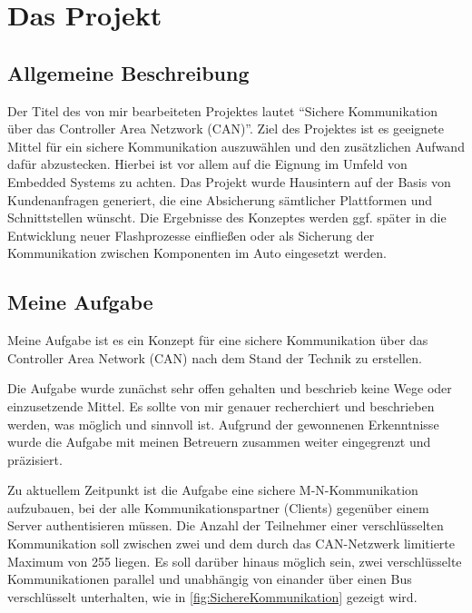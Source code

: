 \section{Das Projekt}
\subsection{Allgemeine Beschreibung}

Der Titel des von mir bearbeiteten Projektes lautet "`Sichere Kommunikation über das Controller Area Netzwork (CAN)"'. 
Ziel des Projektes ist es geeignete Mittel für ein sichere Kommunikation auszuwählen und den zusätzlichen Aufwand dafür abzustecken. Hierbei ist vor allem auf die Eignung im Umfeld von Embedded Systems zu achten. 
Das Projekt wurde Hausintern auf der Basis von Kundenanfragen generiert, die eine Absicherung sämtlicher Plattformen und Schnittstellen wünscht.
Die Ergebnisse des Konzeptes werden ggf. später in die Entwicklung neuer Flashprozesse einfließen oder als Sicherung der Kommunikation zwischen Komponenten im Auto eingesetzt werden.


\subsection{Meine Aufgabe} %

Meine Aufgabe ist es ein Konzept für eine sichere Kommunikation über das Controller Area Network (CAN) nach dem Stand der Technik zu erstellen. 

Die Aufgabe wurde zunächst sehr offen gehalten und beschrieb keine Wege oder einzusetzende Mittel. Es sollte von mir genauer recherchiert und beschrieben werden, was möglich und sinnvoll ist. Aufgrund der gewonnenen Erkenntnisse wurde die Aufgabe mit meinen Betreuern zusammen weiter eingegrenzt und präzisiert. 

Zu aktuellem Zeitpunkt ist die Aufgabe eine sichere M-N-Kommunikation aufzubauen, bei der alle Kommunikationspartner (Clients) gegenüber einem Server authentisieren müssen. Die Anzahl der Teilnehmer einer verschlüsselten Kommunikation soll zwischen zwei und dem durch das CAN-Netzwerk limitierte Maximum von 255 liegen. Es soll darüber hinaus möglich sein, zwei verschlüsselte Kommunikationen parallel und unabhängig von einander über einen Bus verschlüsselt unterhalten, wie in \autoref{fig:SichereKommunikation} gezeigt wird. 



